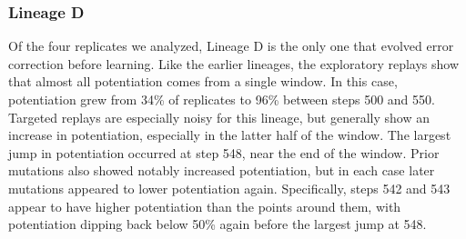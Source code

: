 \subsubsection{Lineage D}


Of the four replicates we analyzed, Lineage D is the only one that evolved error correction before learning.
Like the earlier lineages, the exploratory replays show that almost all potentiation comes from a single window. 
In this case, potentiation grew from 34\% of replicates to 96\% between steps 500 and 550.
Targeted replays are especially noisy for this lineage, but generally show an increase in potentiation, especially in the latter half of the window.
The largest jump in potentiation occurred at step 548, near the end of the window.
Prior mutations also showed notably increased potentiation, but in each case later mutations appeared to lower potentiation again. %
Specifically, steps 542 and 543 appear to have higher potentiation than the points around them, with potentiation dipping back below 50\% again before the largest jump at 548.

